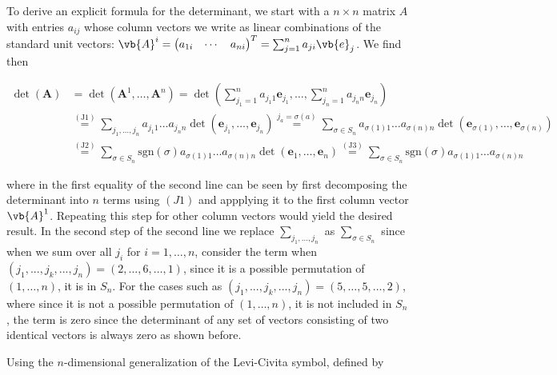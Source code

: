 \documentclass[a4paper,12pt]{report}
\begin{document}
To derive an explicit formula for the determinant, we start with a \(n \times n\) matrix \(A\) with entries \(a_{ij} \) whose column vectors we write as linear combinations of the standard unit vectors: \(\vb{A} ^{i} = \begin{pmatrix}
         a_{1i}  &
         \cdots  &
         a_{ni} 
    \end{pmatrix}^T = \sum_{j=1}^{n} a_{ji} \vb{e} _{j}\). We find then

\begin{equation} \label{detdef} 
\begin{aligned}
\det(\mathbf{A}) &= \det(\mathbf{A}^1, \ldots, \mathbf{A}^n) = \det \left( \sum_{j_1=1}^{n} a_{j_1 1} \mathbf{e}_{j_1}, \ldots, \sum_{j_n=1}^{n} a_{j_n n} \mathbf{e}_{j_n} \right) \\ &\overset{(\text{J1})}{=} \sum_{j_1, \ldots, j_n} a_{j_1 1} \ldots a_{j_n n} \det(\mathbf{e}_{j_1}, \ldots, \mathbf{e}_{j_n}) \overset{j_a = \sigma(a)}{=} \sum_{\sigma \in S_n} a_{\sigma(1) 1} \ldots a_{\sigma(n) n} \det(\mathbf{e}_{\sigma(1)}, \ldots, \mathbf{e}_{\sigma(n)}) \\ &\overset{(\text{J2})}{=} \sum_{\sigma \in S_n} \text{sgn}(\sigma) a_{\sigma(1) 1} \ldots a_{\sigma(n) n} \det(\mathbf{e}_1, \ldots, \mathbf{e}_n) \overset{(\text{J3})}{=} \sum_{\sigma \in S_n} \text{sgn}(\sigma) a_{\sigma(1) 1} \ldots a_{\sigma(n) n}
\end{aligned}
\end{equation}

where in the first equality of the second line can be seen by first decomposing the determinant into \(n\) terms using \((J1)\) and appplying it to the first column vector \(\vb{A} ^{1} \). Repeating this step for other column vectors would yield the desired result. In the second step of the second line we replace \(\sum_{j_1 ,..., j_{n} }^{} \) as \(\sum_{\sigma \in S_{n} }^{} \) since when we sum over all \(j_{i}\) for \(i = 1,\ldots ,n\), consider the term when \((j_1 , ..., j_{k}, ..., j_{n}) = (2,\ldots ,6,\ldots ,1)\), since it is a possible permutation of \((1,\ldots ,n)\), it is in \(S_{n} \). For the cases such as \((j_1 , ..., j_{k}, ..., j_{n}) = (5,\ldots ,5,\ldots ,2)\), where since it is not a possible permutation of \((1,\ldots ,n)\), it is not included in \(S_{n} \), the term is zero since the determinant of any set of vectors consisting of two identical vectors is always zero as shown before.

Using the \(n\)-dimensional generalization of the Levi-Civita symbol, defined by 
\end{document}
